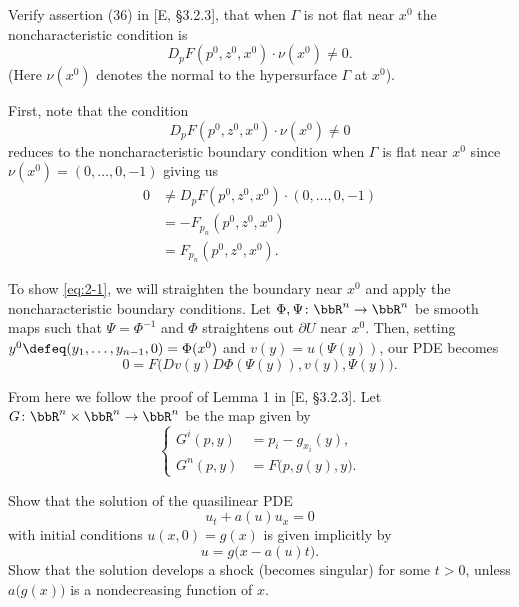 \begin{problem}
  Verify assertion (36) in [E, \S 3.2.3], that when \(\Gamma\) is not flat
  near \(x^0\) the noncharacteristic condition is
  \[
    D_pF(p^0,z^0,x^0)\cdot \nu(x^0)\neq 0.
  \]
  (Here \(\nu(x^0)\) denotes the normal to the hypersurface \(\Gamma\) at
  \(x^0\)).
\end{problem}
\begin{solution}
  First, note that the condition
  \begin{equation}
    \label{eq:2-1}
    D_pF(p^0,z^0,x^0)\cdot \nu(x^0)\neq 0
  \end{equation}
  reduces to the noncharacteristic boundary condition when \(\Gamma\) is
  flat near \(x^0\) since \(\nu(x^0)=(0,\dotsc,0,-1)\) giving us
  \begin{align*}
    0&\neq D_pF(p^0,z^0,x^0)\cdot (0,\dotsc,0,-1)\\
     &=-F_{p_n}(p^0,z^0,x^0)\\
     &=F_{p_n}(p^0,z^0,x^0).
  \end{align*}

  To show \eqref{eq:2-1}, we will straighten the boundary near \(x^0\) and
  apply the noncharacteristic boundary conditions. Let
  \(\Phi,\Psi\colon\bbR^n\to\bbR^n\) be smooth maps such that
  \(\Psi=\Phi^{-1}\) and \(\Phi\) straightens out \(\partial U\) near
  \(x^0\). Then, setting \(y^0\defeq (y_1,\dotsc,y_{n-1},0)=\Phi(x^0)\) and
  \(v(y)=u(\Psi(y))\), our PDE becomes
  \[
    0=F\bigl(Dv(y)D\Phi(\Psi(y)),v(y),\Psi(y)\bigr).
  \]


  From here we follow the proof of Lemma 1 in [E, \S 3.2.3]. Let
  \(G\colon\bbR^n\times\bbR^n\to\bbR^n\) be the map given by
  \[
    \left\{
      \begin{aligned}
        G^i(p,y)&=p_i-g_{x_i}(y),\\
        G^n(p,y)&=F\bigl(p,g(y),y\bigr).
      \end{aligned}
    \right.
  \]
\end{solution}
\newpage

\begin{problem}
  Show that the solution of the quasilinear PDE
  \[
    u_t+a(u)u_x=0
  \]
  with initial conditions \(u(x,0)=g(x)\) is given implicitly by
  \[
    u=g\bigl(x-a(u)t\bigr).
  \]
  Show that the solution develops a shock (becomes singular) for some
  \(t>0\), unless \(a\bigl(g(x)\bigr)\) is a nondecreasing function of
  \(x\).
\end{problem}
\begin{solution}

\end{solution}
\newpage


